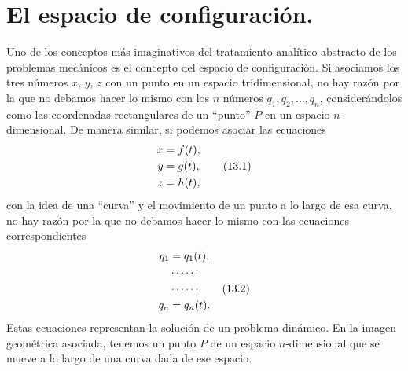 \documentclass[12pt,a4paper]{book}
\begin{document}
\begin{center}
\end{center}


\section{El espacio de configuraci\'on.}

Uno de los conceptos m\'as imaginativos del tratamiento anal\'itico abstracto de los problemas mec\'anicos es el concepto del espacio de configuraci\'on. Si asociamos los tres n\'umeros $x$, $y$, $z$ con un punto en un espacio tridimensional, no hay raz\'on por la que no debamos hacer lo mismo con los $n$ n\'umeros $q_1, q_2, \ldots, q_n$, consider\'andolos como las coordenadas rectangulares de un ``punto'' $P$ en un espacio $n$-dimensional. De manera similar, si podemos asociar las ecuaciones
\begin{align}
x &= f(t), \notag\\
y &= g(t), \tag{13.1}\\
z &= h(t), \notag
\end{align}
con la idea de una ``curva'' y el movimiento de un punto a lo largo de esa curva, no hay raz\'on por la que no debamos hacer lo mismo con las ecuaciones correspondientes
\begin{align}
q_1 &= q_1(t), \notag\\
&\cdots\cdots \notag\\
&\cdots\cdots \tag{13.2}\\
q_n &= q_n(t). \notag
\end{align}
Estas ecuaciones representan la soluci\'on de un problema din\'amico. En la imagen geom\'etrica asociada, tenemos un punto $P$ de un espacio $n$-dimensional que se mueve a lo largo de una curva dada de ese espacio.
\end{document}
